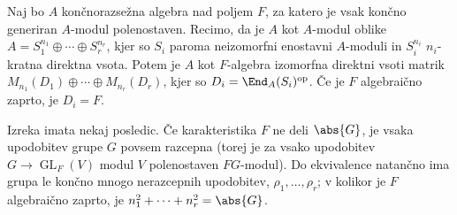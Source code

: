 \begin{izrek}
  Naj bo $A$ končnorazsežna algebra nad poljem $F$, za katero je vsak končno
  generiran $A$-modul polenostaven.
  Recimo, da je $A$ kot $A$-modul oblike $A = S_1^{n_1} \oplus \cdots \oplus
  S_r^{n_r}$, kjer so $S_i$ paroma neizomorfni enostavni $A$-moduli in
  $S_i^{n_i}$ $n_i$-kratna direktna vsota.
  Potem je $A$ kot $F$-algebra izomorfna direktni vsoti matrik $M_{n_1}(D_1)
  \oplus \cdots \oplus M_{n_r}(D_r)$, kjer so $D_i = \End_A(S_i)^{\text{op}}$.
  Če je $F$ algebraično zaprto, je $D_i = F$.
\end{izrek}

Izreka imata nekaj posledic.
Če karakteristika $F$ ne deli $\abs{G}$, je vsaka upodobitev grupe $G$ povsem
razcepna (torej je za vsako upodobitev $G \to \operatorname{GL}_F(V)$ modul $V$
polenostaven $FG$-modul).
Do ekvivalence natančno ima grupa le končno mnogo nerazcepnih upodobitev,
$\rho_1, \ldots, \rho_r$; v kolikor je $F$ algebraično zaprto, je $n_1^2 +
\cdots + n_r^2 = \abs{G}$.

